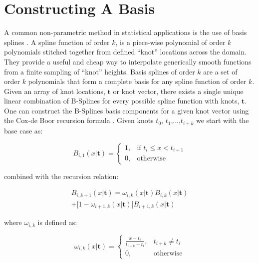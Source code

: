 \section{Constructing A Basis} \label{sec:basis_splines}

A common non-parametric method in statistical applications is the use of basis splines . A spline function of order $k$, 
is a piece-wise polynomial of order $k$ polynomials stitched together from defined ``knot'' locations across the domain. 
They provide a useful and cheap way to interpolate generically smooth functions from a finite sampling of ``knot'' heights. 
Basis splines of order $k$ are a set of order $k$ polynomials that form a complete basis for any spline function of order $k$. 
Given an array of knot locations, $\mathbf{t}$ or knot vector, there exists a single unique linear combination of B-Splines for 
every possible spline function with knots, $\mathbf{t}$. One can construct the B-Splines basis components for a given knot vector 
using the Cox-de Boor recursion formula . Given knots $t_0$, $t_1$,...,$t_{i+k}$ we start with the base case as:

\begin{equation}
    B_{i,1}(x | \mathbf{t}) = 
    \begin{cases}
        1, & \text{if } t_i \leq x < t_{i+1} \\
        0, & \text{otherwise}
    \end{cases}
\end{equation}

\noindent combined with the recursion relation:

\begin{multline*}
    B_{i,k+1}(x | \mathbf{t}) = \omega_{i,k}(x | \mathbf{t})B_{i,k}(x | \mathbf{t})\\
                                + \big[1-\omega_{i+1,k}(x | \mathbf{t})\big] B_{i+1,k}(x | \mathbf{t})
\end{multline*}

\noindent where $\omega_{i,k}$ is defined as:

\begin{equation}
\omega_{i,k}(x | \mathbf{t}) =
\begin{cases}
    \frac{x-t_i}{t_{i+k}-t_i}, & t_{i+k} \neq t_i \\
    0, & \text{otherwise}
\end{cases}
\end{equation}

